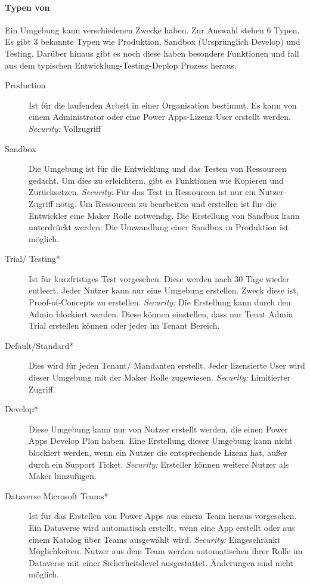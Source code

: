 \paragraph*{Typen von \Env}
Ein Umgebung kann verschiedenen Zwecke haben. Zur Auswahl stehen 6 Typen. Es gibt 3 bekannte Typen wie Produktion, Sandbox (Ursprünglich Develop) und Testing. Darüber hinaus gibt es noch diese haben besondere Funktionen und fall aus dem typischen Entwicklung-Testing-Deplop Prozess heraus.
\begin{description}
	\item[Production] Ist für die laufenden Arbeit in einer Organisation bestimmt. Es kann von einem Administrator oder eine Power Apps-Lizenz User erstellt werden. \textit{Security:} Vollzugriff
	\item[Sandbox] Die Umgebung ist für die Entwicklung und das Testen von Ressourcen gedacht. Um dies zu erleichtern, gibt es Funktionen wie Kopieren und Zurücksetzen. \textit{Security:} Für das Test in Ressourcen ist nur ein Nutzer-Zugriff nötig. Um Ressourcen zu bearbeiten und erstellen ist für die Entwickler eine \Env Maker Rolle notwendig. Die Erstellung von Sandbox kann unterdrückt werden. Die Umwandlung einer Sandbox in Produktion ist möglich.
		\item[Trial/ Testing*] Ist für kurzfristiges Test vorgesehen. Diese werden nach 30 Tage wieder entleert. Jeder Nutzer kann nur eine Umgebung erstellen. Zweck diese ist, Proof-of-Concepts zu erstellen. \textit{Security:} Die Erstellung kann durch den Admin blockiert werden. Diese können einstellen, dass nur Tenat Admin Trial \Env erstellen können oder jeder im Tenant Bereich.
	\item[Default/Standard*] Dies wird für jeden Tenant/ Mandanten erstellt. Jeder lizensierte User wird dieser Umgebung mit der \Env Maker Rolle zugewiesen. \textit{Security:} Limitierter Zugriff.
	\item[Develop*] Diese Umgebung kann nur von Nutzer erstellt werden, die einen Power Apps Develop Plan haben. Eine Erstellung dieser Umgebung kann nicht blockiert werden, wenn ein Nutzer die entsprechende Lizenz hat, außer durch ein Support Ticket. \textit{Security:} Ersteller können weitere Nutzer als \Env Maker hinzufügen. 
	\item[Dataverse Microsoft Teams*] Ist für das Erstellen von Power Apps aus einem Team heraus vorgesehen. Ein Dataverse wird automatisch erstellt, wenn eine App erstellt oder aus einem Katalog über Teams ausgewählt wird. \textit{Security:} Eingeschränkt Möglichkeiten. Nutzer aus dem Team werden automatischen ihrer Rolle im Dataverse mit einer Sicherheitslevel ausgestattet. Änderungen sind nicht möglich. 
\end{description}

